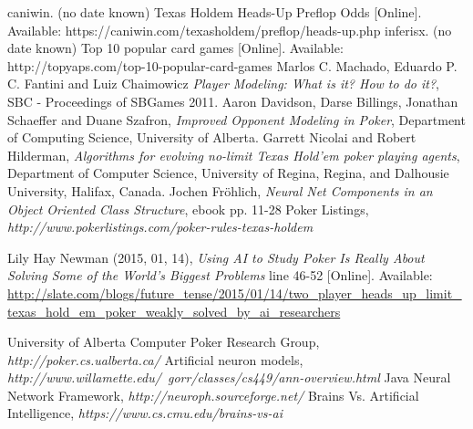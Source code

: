 \begin{thebibliography}{100} 
 caniwin. (no date known) Texas Holdem Heads-Up Preflop Odds [Online]. Available: https://caniwin.com/texasholdem/preflop/heads-up.php
 inferisx. (no date known) Top 10 popular card games [Online]. Available: http://topyaps.com/top-10-popular-card-games
 Marlos C. Machado, Eduardo P. C. Fantini and Luiz Chaimowicz \emph{Player Modeling: What is it? How to do it?}, SBC - Proceedings of SBGames 2011.
 Aaron Davidson, Darse Billings, Jonathan Schaeffer and Duane Szafron, \emph{Improved Opponent Modeling in Poker},
Department of Computing Science, University of Alberta.
 Garrett Nicolai and Robert Hilderman, \emph{Algorithms for evolving no-limit Texas Hold'em poker playing agents}, Department of Computer Science, University of Regina, Regina, and Dalhousie University, Halifax, Canada.
 Jochen Fröhlich, \emph {Neural Net Components in an Object Oriented Class Structure}, 
ebook pp. 11-28
 Poker Listings, \emph {http://www.pokerlistings.com/poker-rules-texas-holdem}


 Lily Hay Newman (2015, 01, 14), \emph{Using AI to Study Poker Is Really About Solving Some of the World’s Biggest Problems} line 46-52 [Online]. Available: \url{http://slate.com/blogs/future_tense/2015/01/14/two_player_heads_up_limit_texas_hold_em_poker_weakly_solved_by_ai_researchers}


 University of Alberta Computer Poker Research Group, \emph{http://poker.cs.ualberta.ca/}
 Artificial neuron models, \emph{http://www.willamette.edu/~gorr/classes/cs449/ann-overview.html}
 Java Neural Network Framework, \emph{http://neuroph.sourceforge.net/}
 Brains Vs. Artificial Intelligence, \emph{https://www.cs.cmu.edu/brains-vs-ai}
\end{thebibliography}